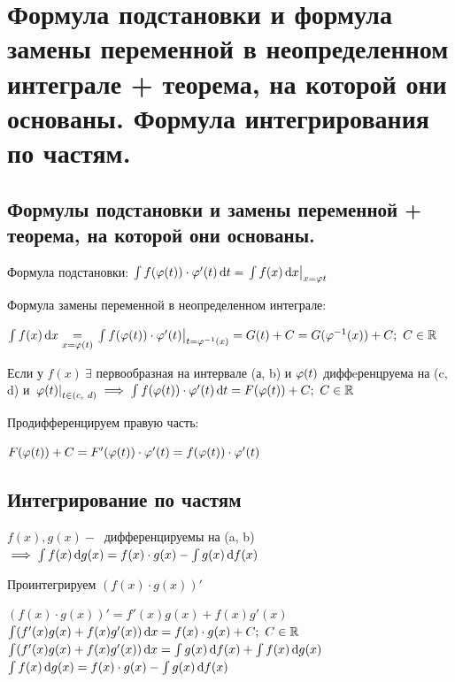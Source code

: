 \section{Формула подстановки и формула замены переменной в неопределенном интеграле + теорема, на которой они основаны. Формула интегрирования по частям.}

\subsection{Формулы подстановки и замены переменной + теорема, на которой они основаны.}
\begin{definition}
    Формула подстановки: $\int f(\varphi(t)) \cdot \varphi'(t) \mathop{}\!\mathrm{d} t = \left. \int f(x) \mathop{}\!\mathrm{d} x \right|_{x = \varphi t}$ 

    Формула замены переменной в неопределенном интеграле:
    
    $\int f(x) \mathop{}\!\mathrm{d} x \underset{x = \varphi(t)}{=} \left. \int f(\varphi(t)) \cdot \varphi'(t) \right|_{t = \varphi^{-1}(x)} = G(t) + C = G(\varphi^{-1}(x)) + C;~C \in \mathbb{R}$
\end{definition}

\begin{theorem}
    Если у $f(x) ~\exists$ первообразная на интервале (а, b) и $\varphi(t)$ диффeренцруема на (c, d) и $\left. \varphi(t) \right|_{t \in (c,~d)} \implies \int f(\varphi(t))\cdot\varphi'(t)\mathop{}\!\mathrm{d} t = F(\varphi(t)) + C;~C\in\mathbb{R}$

\end{theorem}


\begin{Proof}
    Продифференцируем правую часть:

    $F(\varphi(t)) + C = F'(\varphi(t))\cdot\varphi'(t) = f(\varphi(t))\cdot\varphi'(t)$
\end{Proof}



\subsection{Интегрирование по частям}
\begin{theorem}
    
    $f(x), g(x) -~$ дифференцируемы на (a, b) $\implies \int f(x)\mathop{}\!\mathrm{d} g(x) = f(x)\cdot g(x) - \int g(x)\mathop{}\!\mathrm{d} f(x)$

\end{theorem}

\begin{Proof}
Проинтегрируем $(f(x)\cdot g(x))'$

$(f(x)\cdot g(x))' = f'(x)g(x) + f(x)g'(x)$\\
$\int (f'(x)g(x) + f(x)g'(x))\mathop{}\!\mathrm{d} x = f(x)\cdot g(x) + C;~ C \in \mathbb{R}$\\
$\int (f'(x)g(x) + f(x)g'(x))\mathop{}\!\mathrm{d} x = \int g(x)\mathop{}\!\mathrm{d} f(x) + \int f(x)\mathop{}\!\mathrm{d} g(x)$\\
$\int f(x)\mathop{}\!\mathrm{d} g(x) = f(x)\cdot g(x) - \int g(x) \mathop{}\!\mathrm{d} f(x)$

\end{Proof}
